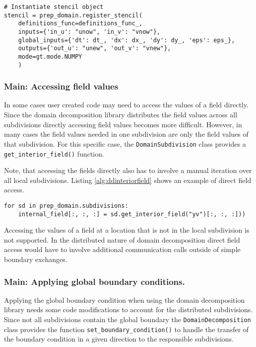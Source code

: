 \begin{lstlisting}[caption={Example code for the same stencil instantiation using the domain decomposition library.},captionpos=b, label={alg:ddstencil}, float, floatplacement=H]
# Instantiate stencil object
stencil = prep_domain.register_stencil(
    definitions_func=definitions_func_,
    inputs={'in_u': "unow", 'in_v': "vnow"},
    global_inputs={'dt': dt_, 'dx': dx_, 'dy': dy_, 'eps': eps_},
    outputs={'out_u': "unew", 'out_v': "vnew"},
    mode=gt.mode.NUMPY
    )
\end{lstlisting}

\subsubsection{Main: Accessing field values}

In some cases user created code may need to access the values of a field directly.
Since the domain decomposition library distributes the field values across all subdivisions directly accessing field values becomes more difficult.
However, in many cases the field values needed in one subdivision are only the field values of that subdivision.
For this specific case, the \texttt{DomainSubdivision} class provides a \texttt{get\_interior\_field()} function.

Note, that accessing the fields directly also has to involve a manual iteration over all local subdivisions.
Listing \ref{alg:ddinteriorfield} shows an example of direct field access.

\begin{lstlisting}[caption={Example code for accessing the interior field of a subdivision directly.}, captionpos=b, label={alg:ddinteriorfield}, float, floatplacement=H]
for sd in prep_domain.subdivisions:
    internal_field[:, :, :] = sd.get_interior_field("yv")[:, :, :]))
\end{lstlisting}

Accessing the values of a field at a location that is not in the local subdivision is not supported.
In the distributed nature of domain decomposition direct field access would have to involve additional communication calls outside of simple boundary exchanges.

\subsubsection{Main: Applying global boundary conditions.}
Applying the global boundary condition when using the domain decomposition library needs some code modifications to account for the distributed subdivisions.
Since not all subdivisions contain the global boundary the \texttt{DomainDecomposition} class provides the function \texttt{set\_boundary\_condition()} to handle the transfer of the boundary condition in a given direction to the responsible subdivisions.

